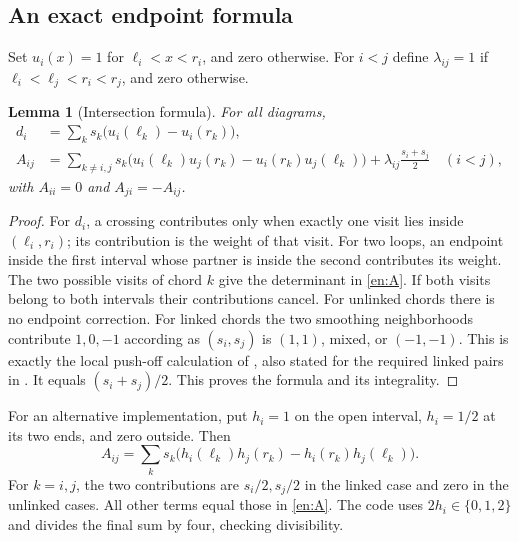 \documentclass[12pt]{amsart}
\newtheorem{lem}[thm]{Lemma}
\theoremstyle{definition}
\theoremstyle{remark}
\numberwithin{equation}{section}
\begin{document}
\subsection{An exact endpoint formula}
Set $u_i(x)=1$ for $\ell_i<x<r_i$, and zero otherwise. For $i<j$ define
$\lambda_{ij}=1$ if $\ell_i<\ell_j<r_i<r_j$, and zero otherwise.
\begin{lem}[Intersection formula]\label{en:intersection}
For all diagrams,
\begin{align}
d_i&=\sum_k s_k\bigl(u_i(\ell_k)-u_i(r_k)\bigr),\label{en:d}\\
A_{ij}&=\sum_{k\ne i,j}s_k\bigl(u_i(\ell_k)u_j(r_k)
-u_i(r_k)u_j(\ell_k)\bigr)
+\lambda_{ij}\frac{s_i+s_j}{2}\quad(i<j),\label{en:A}
\end{align}
with $A_{ii}=0$ and $A_{ji}=-A_{ij}$.
\end{lem}
\begin{proof}
For $d_i$, a crossing contributes only when exactly one visit lies inside
$(\ell_i,r_i)$; its contribution is the weight of that visit. For two
loops, an endpoint inside the first interval whose partner is inside the
second contributes its weight. The two possible visits of chord $k$
give the determinant in \eqref{en:A}. If both visits belong to both
intervals their contributions cancel. For unlinked chords there is no
endpoint correction. For linked chords the two smoothing neighborhoods
contribute $1,0,-1$ according as $(s_i,s_j)$ is $(1,1)$, mixed, or
$(-1,-1)$. This is exactly the local push-off calculation of
\cite[Lemma 3.2]{HNNS}, also stated for the required linked pairs in
\cite[\S3, following Remark 3.3]{SW}. It equals $(s_i+s_j)/2$.
This proves the formula and its integrality.
\end{proof}

For an alternative implementation, put $h_i=1$ on the open interval,
$h_i=1/2$ at its two ends, and zero outside. Then
\begin{equation}\label{en:half}
A_{ij}=\sum_k s_k\bigl(h_i(\ell_k)h_j(r_k)-h_i(r_k)h_j(\ell_k)\bigr).
\end{equation}
For $k=i,j$, the two contributions are $s_i/2,s_j/2$ in the linked
case and zero in the unlinked cases. All other terms equal those in
\eqref{en:A}. The code uses $2h_i\in\{0,1,2\}$ and divides the final
sum by four, checking divisibility.
\end{document}
